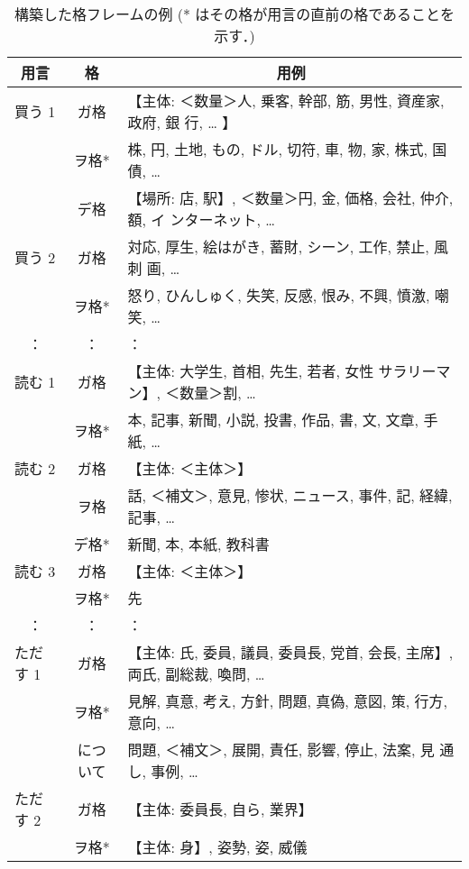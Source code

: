 \begin{table*}[tbp]
 \begin{center}
  \caption{構築した格フレームの例
  (* はその格が用言の直前の格であることを示す．)}
  \label{構築した格フレームの例}
  \begin{tabular}{l|c|l} \hline
   \multicolumn{1}{c|}{用言} & 格 & \multicolumn{1}{c}{用例} \\ \hline\hline
   買う 1 & ガ格 & 【主体: ＜数量＞人, 乗客, 幹部, 筋, 男性, 資産家, 政府, 銀
   行, … 】 \\
          & ヲ格* & 株, 円, 土地, もの, ドル, 切符, 車, 物, 家, 株式, 国
   債, … \\
          & デ格 & 【場所: 店, 駅】, ＜数量＞円, 金, 価格, 会社, 仲介, 額, イ
   ンターネット, … \\ \hline
   買う 2 & ガ格 & 対応, 厚生, 絵はがき, 蓄財, シーン, 工作, 禁止, 風刺
   画, … \\
          & ヲ格* & 怒り, ひんしゅく, 失笑, 反感, 恨み, 不興, 憤激, 嘲笑,
   …\\ \hline
   \multicolumn{1}{c|}{：} & \multicolumn{1}{c|}{：} & ： \\ \hline\hline
   読む 1 & ガ格 & 【主体: 大学生, 首相, 先生, 若者, 女性 サラリーマン】, 
   ＜数量＞割, … \\
          & ヲ格* & 本, 記事, 新聞, 小説, 投書, 作品, 書, 文, 文章, 手紙,
   … \\ \hline
   読む 2 & ガ格 & 【主体: ＜主体＞】 \\
          & ヲ格 & 話, ＜補文＞, 意見, 惨状, ニュース, 事件, 記, 経緯,
   記事, … \\
          & デ格* & 新聞, 本, 本紙, 教科書 \\ \hline
   読む 3 & ガ格 & 【主体: ＜主体＞】 \\
          & ヲ格* & 先 \\ \hline
   \multicolumn{1}{c|}{：} & \multicolumn{1}{c|}{：} & ： \\ \hline\hline
   ただす 1 & ガ格 & 【主体: 氏, 委員, 議員, 委員長, 党首, 会長, 主席】,
   両氏, 副総裁, 喚問, …\\
          & ヲ格* & 見解, 真意, 考え, 方針, 問題, 真偽, 意図, 策, 行方,
   意向, … \\
          & について & 問題, ＜補文＞, 展開, 責任, 影響, 停止, 法案, 見
   通し, 事例, … \\ \hline
   ただす 2 & ガ格 & 【主体: 委員長, 自ら, 業界】 \\
          & ヲ格* & 【主体: 身】, 姿勢, 姿, 威儀 \\ \hline

\end{tabular}
\end{center}
\end{table*}
